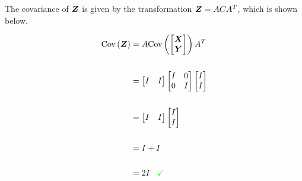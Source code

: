 The covariance of $\boldsymbol{Z}$ is given by the transformation $\boldsymbol{Z} = A C A^T$, which is shown below.

\begin{align*}
	\textrm{Cov}\left(\boldsymbol{Z}\right) &= A \textrm{Cov}\left(\begin{bmatrix} \boldsymbol{X} \\ \boldsymbol{Y} \end{bmatrix}\right) A^T \\
	\\
	&= \begin{bmatrix} I & I \end{bmatrix} \begin{bmatrix} I & 0 \\ 0 & I \end{bmatrix} \begin{bmatrix} I \\ I \end{bmatrix} \\
	\\
	&= \begin{bmatrix} I & I \end{bmatrix} \begin{bmatrix} I \\ I \end{bmatrix} \\
	\\
	&= I + I \\
	\\
	&= 2I \,\,\,\,\, \textcolor{green}{\checkmark}
\end{align*}

